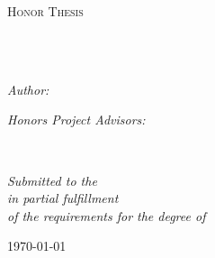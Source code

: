 \documentclass[
11pt,
english, %
doublespacing,
liststotoc, %
headsepline, %
openany
]{MastersDoctoralThesis} %
\author{Wenqin \textsc{Chen}} %
\begin{document}
\frontmatter %

\pagestyle{plain} %


\begin{titlepage}
\begin{center}

\vspace*{.06\textheight}
{\scshape\LARGE \univname\par}\vspace{1.5cm} %
\textsc{\Large Honor Thesis}\\[0.5cm] %

\HRule \\[0.4cm] %
{\huge \bfseries \ttitle\par}\vspace{0.4cm} %
\HRule \\[1.5cm] %
 
\begin{minipage}[t]{0.4\textwidth}
\begin{flushleft} \large
\emph{Author:}\\
\authorname %
\end{flushleft}
\end{minipage}
\begin{minipage}[t]{0.4\textwidth}
\begin{flushright} \large
\emph{Honors Project Advisors:} \\
\supname %
\end{flushright}
\end{minipage}\\[3cm]
 
\vfill

\large \textit{Submitted to the \deptname}\\
\textit{in partial fulfillment}\\
\textit{of the requirements for the degree of \degreename}
 
\vfill

{\large \today}\\[4cm] %
 
\vfill
\end{center}
\end{titlepage}
\end{document}
